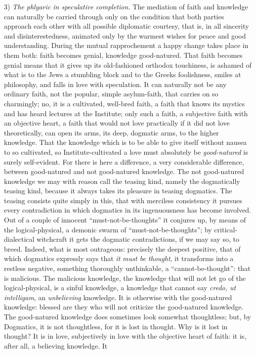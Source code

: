 \documentclass[12pt]{book}
\newcommand{\opage}[1]{\marginnote{\footnotesize\textit{[#1]}}}
\begin{document}
3) \emph{The phlyaric in speculative completion.} The mediation of faith and knowledge can naturally be carried through only on the condition that both parties approach each other with all possible diplomatic courtesy, that is, in all sincerity and disinterestedness, animated only by the warmest wishes for peace and good understanding. During the mutual rapprochement a happy change takes place in them both: faith becomes genial, knowledge good-natured. That faith becomes genial means that it gives up its old-fashioned orthodox touchiness, is ashamed of what is to the Jews a stumbling block and to the Greeks foolishness, smiles at philosophy, and falls in love with speculation. It can naturally not
\opage{94}\setcounter{footnote}{0}%
be any ordinary faith, not the popular, simple asylum-faith, that carries on so charmingly; no, it is a cultivated, well-bred faith, a faith that knows its mystics and has heard lectures at the Institute; only such a faith, a subjective faith with an objective heart, a faith that would not love practically if it did not love theoretically, can open its arms, its deep, dogmatic arms, to the higher knowledge. That the knowledge which is to be able to give itself without nausea to so cultivated, so Institute-cultivated a love must absolutely be \emph{good-natured} is surely self-evident. For there is here a difference, a very considerable difference, between good-natured and not good-natured knowledge. The not good-natured knowledge we may with reason call the teasing kind, namely the dogmatically teasing kind, because it always takes its pleasure in teasing dogmatics. The teasing consists quite simply in this, that with merciless consistency it pursues every contradiction in which dogmatics in its ingenuousness has become involved. Out of a couple of innocent ``must-not-be-thoughts'' it conjures up, by means of the logical-physical, a demonic swarm of ``must-not-be-thoughts''; by critical-dialectical witchcraft it gets the dogmatic contradictions, if we may say so, to breed. Indeed, what is most outrageous: precisely the deepest positive, that of which dogmatics expressly says that \emph{it must be thought}, it transforms into a restless negative, something thoroughly unthinkable, a ``cannot-be-thought'': that is malicious. The malicious knowledge, the knowledge that will not let go of the logical-physical, is a sinful knowledge, a knowledge that cannot say \textit{credo, ut intelligam}, an \emph{unbelieving} knowledge. It is otherwise with the good-natured knowledge: blessed are they who will not criticize the good-natured knowledge. The good-natured knowledge does sometimes look somewhat thoughtless; but, by Dogmatics, it is not thoughtless, for it is lost in thought. Why is it lost in thought? It is in love, subjectively in love with the objective heart of faith: it is, after all, a believing knowledge. It
\end{document}
